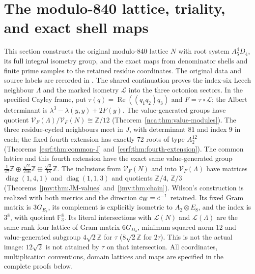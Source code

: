 
\section{The modulo-840 lattice, triality, and exact shell maps}
\label{esn:sec:shared}

This section constructs the original modulo-$840$ lattice $N$ with
root system $A_5^4D_4$, its full integral isometry group, and the exact
maps from denominator shells and finite prime samples to the retained
residue coordinates. The original data and source labels are recorded in
\cite{esn:Provenance}. The shared continuation proves the index-six Leech
neighbour $\Lambda$ and the marked isometry $\mathcal L$ into the three
octonion sectors. In the specified Cayley frame, put
$\tau(q)=\operatorname{Re}((q_1q_2)q_3)$ and $F=\tau\circ\mathcal L$;
the Albert determinant is $\lambda^3-\lambda(y,y)+2F(y)$.
The value-generated groups have quotient
$\mathcal V_F(\Lambda)/\mathcal V_F(N)\cong\mathbb Z/12$
(Theorem~\ref{nca:thm:value-modules}). The three residue-cycled neighbours
meet in $J$, with determinant $81$ and index $9$ in each; the fixed
fourth extension has exactly $72$ roots of type $A_2^{12}$
(Theorems~\ref{esrf:thm:common-J} and~\ref{esrf:thm:fourth-extension}).
The common lattice and this fourth extension have the exact same
value-generated group
$\frac1{27}\mathbb Z\oplus\frac{\sqrt2}{216}\mathbb Z
\oplus\frac{\sqrt3}{18}\mathbb Z$.
The inclusions from $\mathcal V_F(N)$ and into $\mathcal V_F(\Lambda)$
have matrices $\operatorname{diag}(1,4,1)$ and
$\operatorname{diag}(1,1,3)$ and quotients $\mathbb Z/4$, $\mathbb Z/3$
(Theorems~\ref{jmv:thm:JM-values} and~\ref{jmv:thm:chain}).
Wilson's construction \cite{esn:Wilson2009} is realized with both metrics
and the direction $c_{\rm W}=c^{-1}$ retained. Its fixed Gram matrix is
$3G_{E_8}$, its complement is explicitly isometric to $A_2\otimes E_8$,
and the index is $3^8$, with quotient $\mathbb F_3^8$. Its literal
intersections with $\mathcal L(N)$ and $\mathcal L(\Lambda)$ are the
same rank-four lattice of Gram matrix $6G_{D_4}$, minimum squared norm
$12$ and value-generated subgroup $4\sqrt2\mathbb Z$ for $\tau$
($8\sqrt2\mathbb Z$ for $2\tau$). This is not the actual image:
$12\sqrt2$ is not attained by $\tau$ on that intersection.
All coordinates, multiplication conventions, domain lattices and maps
are specified in the complete proofs below.


